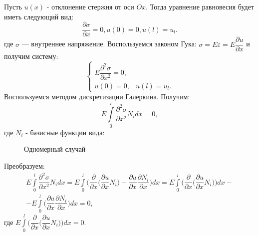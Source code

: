 \documentclass[12pt,a4paper]{article}
\begin{document}
Пусть $u(x)$ - отклонение стержня от оси $Ox$. Тогда уравнение равновесия будет иметь следующий вид:
\begin{equation}
    \dfrac{\partial\sigma}{\partial x} = 0, 
    u(0) = 0, 
    u(l) = u_{l}.
\end{equation}
где $\sigma$ --- внутреннее напряжение. 
Воспользуемся законом Гука: $\sigma = E \varepsilon = E \dfrac{\partial u}{\partial x}$ и получим систему:
\begin{equation}
     \begin{cases}
       E \dfrac{\partial^2\sigma}{\partial x^2} = 0, \\
       u(0) = 0, & u(l) = u_{l}.
     \end{cases}
\end{equation}
Воспользуемся методом дискретизации Галеркина. Получим:
\begin{equation}
    E \int\limits_0^l \dfrac{\partial^2\sigma}{\partial x^2} N_i dx = 0,
\end{equation}
где $N_i$ - базисные функции вида:
\begin{figure}[H]
    \caption{Одномерный случай}
    \label{fig:image}
\end{figure}

Преобразуем:
\begin{equation}
\label{eq1}
\begin{array}{r}
    E \int\limits_0^l \dfrac{\partial^2\sigma}{\partial x^2} N_i dx =
    E \int\limits_0^l\Big(\dfrac{\partial}{\partial x}\big( \dfrac{\partial u}{\partial x}N_i \big) -
    \dfrac{\partial u}{\partial x}\dfrac{\partial N_i}{\partial x}\Big) dx =
    E \int\limits_0^l\Big(\dfrac{\partial}{\partial x}\big( \dfrac{\partial u}{\partial x}N_i \big)\Big) dx -\\
    - E \int\limits_0^l\Big(\dfrac{\partial u}{\partial x}\dfrac{\partial N_i}{\partial x}\Big) dx = 0, 
\end{array}
\end{equation}
где $E \int\limits_0^l\Big(\dfrac{\partial}{\partial x}\big( \dfrac{\partial u}{\partial x}N_i \big)\Big) dx = 0$.
\end{document}
